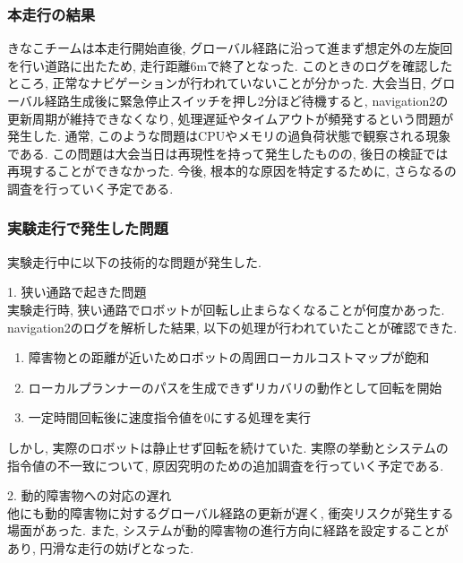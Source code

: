 \subsubsection{本走行の結果}
きなこチームは本走行開始直後, グローバル経路に沿って進まず想定外の左旋回を行い道路に出たため, 走行距離6mで終了となった. 
このときのログを確認したところ, 正常なナビゲーションが行われていないことが分かった. 
大会当日, グローバル経路生成後に緊急停止スイッチを押し2分ほど待機すると, navigation2の更新周期が維持できなくなり, 処理遅延やタイムアウトが頻発するという問題が発生した. 
通常, このような問題はCPUやメモリの過負荷状態で観察される現象である. 
この問題は大会当日は再現性を持って発生したものの, 後日の検証では再現することができなかった. 
今後, 根本的な原因を特定するために, さらなるの調査を行っていく予定である. 

\subsubsection{実験走行で発生した問題}
実験走行中に以下の技術的な問題が発生した. 

1. 狭い通路で起きた問題\\
実験走行時, 狭い通路でロボットが回転し止まらなくなることが何度かあった. 
navigation2のログを解析した結果, 以下の処理が行われていたことが確認できた. 

\begin{enumerate}
  \item 障害物との距離が近いためロボットの周囲ローカルコストマップが飽和
  \item ローカルプランナーのパスを生成できずリカバリの動作として回転を開始
  \item  一定時間回転後に速度指令値を0にする処理を実行
\end{enumerate}

しかし, 実際のロボットは静止せず回転を続けていた. 
実際の挙動とシステムの指令値の不一致について, 原因究明のための追加調査を行っていく予定である. 

2. 動的障害物への対応の遅れ\\
他にも動的障害物に対するグローバル経路の更新が遅く, 衝突リスクが発生する場面があった. 
また, システムが動的障害物の進行方向に経路を設定することがあり, 円滑な走行の妨げとなった. 